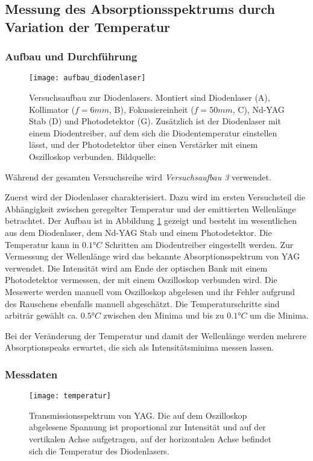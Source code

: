 \documentclass{../Misc/MontavonLaTeX/Montavon}
\newcommand{\halfwidth}{0.48\textwidth}
\newcommand{\fullwidth}{1.0\textwidth}
\begin{document}
\subsection{Messung des Absorptionsspektrums durch Variation der Temperatur}
\subsubsection{Aufbau und Durchführung}
\begin{figure}[htbp]
\centering
\texttt{[image: aufbau\_diodenlaser]}
\caption{Versuchsaufbau zur Diodenlasers. Montiert sind Diodenlaser (A), Kollimator ($f = 6 \unit{mm}$, B), Fokussiereinheit ($f = 50 \unit{mm}$, C), Nd-YAG Stab (D) und Photodetektor (G). Zusätzlich ist der Diodenlaser mit einem Diodentreiber, auf dem sich die Diodentemperatur einstellen lässt, und der Photodetektor über einen Verstärker mit einem Oszilloskop verbunden. Bildquelle: \cite[S. 33]{anleitung1}}
\label{fig:aufbau_diodenlaser}
\end{figure}


Während der gesamten Versuchsreihe wird \emph{Versuchsaufbau 3} verwendet. 

Zuerst wird der Diodenlaser charakterisiert. Dazu wird im ersten Versuchsteil die Abhängigkeit zwischen geregelter Temperatur und der emittierten Wellenlänge betrachtet. Der Aufbau ist in Abbildung \ref{fig:aufbau_diodenlaser} gezeigt und besteht im wesentlichen aus dem Diodenlaser, dem Nd-YAG Stab und einem Photodetektor.
Die Temperatur kann in $0.1 \unit{\degree C}$ Schritten am Diodentreiber eingestellt werden. Zur Vermessung der Wellenlänge wird das bekannte Absorptionsspektrum von YAG verwendet. Die Intensität wird am Ende der optischen Bank mit einem Photodetektor vermessen, der mit einem Oszilloskop verbunden wird. Die Messwerte werden manuell vom Oszilloskop abgelesen und ihr Fehler aufgrund des Rauschens ebenfalls manuell abgeschätzt. Die Temperaturschritte sind arbiträr gewählt ca. $0.5 \unit{\degree C}$ zwischen den Minima und bis zu $0.1 \unit{\degree C}$ um die Minima.

Bei der Veränderung der Temperatur und damit der Wellenlänge werden mehrere Absorptionspeaks erwartet, die sich als Intensitätsminima messen lassen. 

\subsubsection{Messdaten}
\begin{figure}[htbp]
\centering
\texttt{[image: temperatur]}
\caption{Transmissionsspektrum von YAG. Die auf dem Oszilloskop abgelesene Spannung ist proportional zur Intensität und auf der vertikalen Achse aufgetragen, auf der horizontalen Achse befindet sich die Temperatur des Diodenlasers.}
\label{fig:temperatur}
\end{figure}
\end{document}
